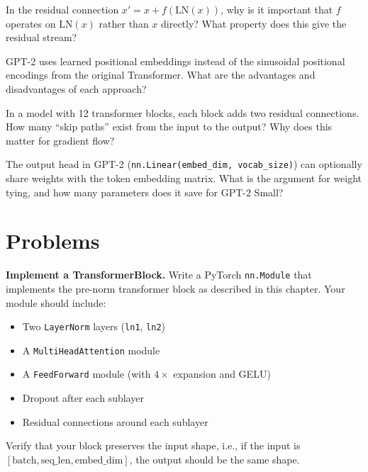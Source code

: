 \begin{reviewquestion}[9]
  In the residual connection $x' = x + f(\text{LN}(x))$, why is it important
  that $f$ operates on $\text{LN}(x)$ rather than $x$ directly? What property
  does this give the residual stream?
\end{reviewquestion}

\begin{reviewquestion}[10]
  GPT-2 uses learned positional embeddings instead of the sinusoidal
  positional encodings from the original Transformer. What are the advantages
  and disadvantages of each approach?
\end{reviewquestion}

\begin{reviewquestion}[11]
  In a model with 12 transformer blocks, each block adds two residual
  connections. How many ``skip paths'' exist from the input to the output?
  Why does this matter for gradient flow?
\end{reviewquestion}

\begin{reviewquestion}[12]
  The output head in GPT-2 (\texttt{nn.Linear(embed\_dim, vocab\_size)}) can
  optionally share weights with the token embedding matrix. What is the
  argument for weight tying, and how many parameters does it save for
  GPT-2 Small?
\end{reviewquestion}

\section*{Problems}

\begin{problem}[1]
  \textbf{Implement a TransformerBlock.} Write a PyTorch
  \texttt{nn.Module} that implements the pre-norm transformer block as described
  in this chapter. Your module should include:
  \begin{itemize}
    \item Two \texttt{LayerNorm} layers (\texttt{ln1}, \texttt{ln2})
    \item A \texttt{MultiHeadAttention} module
    \item A \texttt{FeedForward} module (with $4\times$ expansion and GELU)
    \item Dropout after each sublayer
    \item Residual connections around each sublayer
  \end{itemize}
  Verify that your block preserves the input shape, i.e., if the input is
  $[\text{batch}, \text{seq\_len}, \text{embed\_dim}]$, the output should be
  the same shape.
\end{problem}

